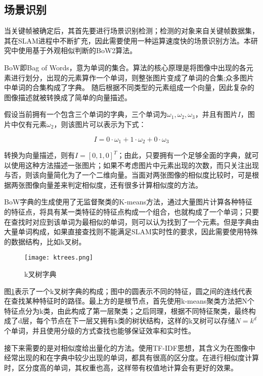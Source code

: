 \subsection{场景识别} \label{3.4.1}

当关键帧被确定后，其首先要进行场景识别检测；检测的对象来自关键帧数据集，其在SLAM进程中不断扩充，因此需要使用一种运算速度快的场景识别方法。本研究中使用基于外观相似判断的BoW2算法。

BoW即Bag of Words，意为单词的集合。算法的核心原理是将图像中出现的各元素进行划分，出现的元素算作一个单词，则整张图片变成了单词的合集;众多图片中单词的合集构成了字典。
随后根据不同类型的元素组成一个向量，因此复杂的图像描述就被转换成了简单的向量描述。

假设当前拥有一个包含三个单词的字典，三个单词为$\omega_1, \omega_2, \omega_3$，并且有图片$I$，图片中仅有元素$\omega_2$，则该图片可以表示为下式：

\begin{equation}
I = 0 \cdot \omega_1 + 1 \cdot \omega_2 + 0 \cdot \omega_3
\end{equation}

转换为向量描述，则有$I=[0, 1, 0]^T$；由此，只要拥有一个足够全面的字典，就可以使用这种方法描述一张图片；如果不考虑图片中元素出现的次数，而只关注出现与否，则该向量简化为了一个二维向量。当面对两张图像的相似度比较时，可是根据两张图像向量差来判定相似度，还有很多计算相似度的方法。

BoW字典的生成使用了无监督聚类的K-means方法，通过大量图片计算各种特征的特征点，将具有某一类特征的特征点构成一个组合，也就构成了一个单词；只要在查找时对应到该单词为最相似的单词，则可以认为找到了一个元素。但是字典由大量单词构成，如果直接查找则不能满足SLAM实时性的要求，因此需要使用特殊的数据结构，比如k叉树。

\begin{figure}[!ht]
	\centering
	\texttt{[image: ktrees.png]}
	\caption{k叉树字典}
	\label{fig-ktrees}
\end{figure}

图\ref{fig-ktrees}表示了一个k叉树字典的构成；图中的圆表示不同的特征，圆之间的连线代表在查找某种特征时的路径。最上方的是根节点，首先使用k-means聚类方法把N个特征点分为k类，由此构成了第一层聚类；之后同理，根据不同特征聚类，最终构成了d层，每个节点在下一层又拥有k类的树状结构，这样的k叉树可以存储$N=k^d$个单词，并且使用分级的方式查找也能够保证效率和实时性。

接下来需要的是对相似度给出量化的方法。使用TF-IDF思想，其含义为在图像中经常出现的和在字典中较少出现的单词，都具有很高的区分度。在进行相似度计算时，区分度高的单词，其权重也高，这样带有权值地计算会有更好的效果。

